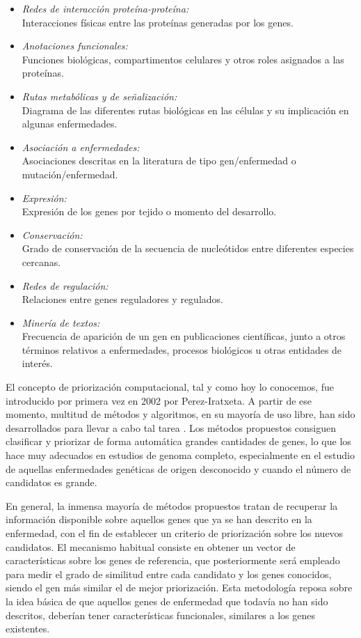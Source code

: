 \bigskip
\begin{itemize}{}{}
\item \emph{Redes de interacción proteína-proteína:}\\ Interacciones físicas entre las proteínas generadas por los genes.
\item \emph{Anotaciones funcionales:}\\Funciones biológicas, compartimentos celulares y otros roles asignados a las proteínas.
\item \emph{Rutas metabólicas y de señalización:}\\Diagrama de las diferentes rutas biológicas en las células y su implicación en algunas enfermedades.
\item \emph{Asociación a enfermedades:}\\Asociaciones descritas en la literatura de tipo gen/enfermedad o mutación/enfermedad.
\item \emph{Expresión:}\\Expresión de los genes por tejido o momento del desarrollo.
\item \emph{Conservación:}\\Grado de conservación de la secuencia de nucleótidos entre diferentes especies cercanas.
\item \emph{Redes de regulación:}\\Relaciones entre genes reguladores y regulados.
\item \emph{Minería de textos:}\\Frecuencia de aparición de un gen en publicaciones científicas, junto a otros términos relativos a enfermedades, procesos biológicos u otras entidades de interés.
\end{itemize}

\bigskip
El concepto de priorización computacional, tal y como hoy lo conocemos, fue introducido por primera vez en 2002 por Perez-Iratxeta\cite{perez-iratxeta}. A partir de ese momento, multitud de métodos y algoritmos, en su mayoría de uso libre, han sido desarrollados para llevar a cabo tal tarea \cite{review1,review2,review3}. Los métodos propuestos consiguen clasificar y priorizar de forma automática grandes cantidades de genes, lo que los hace muy adecuados en estudios de genoma completo, especialmente en el estudio de aquellas enfermedades genéticas de origen desconocido y cuando el número de candidatos es grande.

\medskip
En general, la inmensa mayoría de métodos propuestos tratan de recuperar la información disponible sobre aquellos genes que ya se han descrito en la enfermedad, con el fin de establecer un criterio de priorización sobre los nuevos candidatos. El mecanismo habitual consiste en obtener un vector de características sobre los genes de referencia, que posteriormente será empleado para medir el grado de similitud entre cada candidato y los genes conocidos, siendo el gen más similar el de mejor priorización. Esta metodología reposa sobre la idea básica de que aquellos genes de enfermedad que todavía no han sido descritos, deberían tener características funcionales, similares a los genes existentes. 


